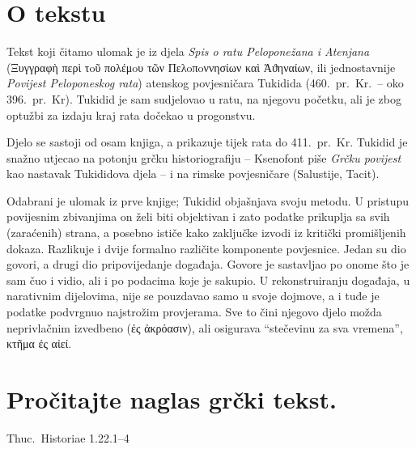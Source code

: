 
\section*{O tekstu}

Tekst koji čitamo ulomak je iz djela \textit{Spis o ratu Peloponežana i Atenjana} \textgreek[variant=ancient]{(Ξυγγραφὴ περὶ τoῦ πολέμoυ τῶν Пελoπoννησίων καὶ Ἀϑηναίων,} ili jednostavnije \textit{Povijest Peloponeskog rata}) atenskog povjesničara Tukidida (460.\ pr.~Kr.\ – oko 396.\ pr.~Kr). Tukidid je sam sudjelovao u ratu, na njegovu početku, ali je zbog optužbi za izdaju kraj rata dočekao u progonstvu. 

Djelo se sastoji od osam knjiga, a prikazuje tijek rata do 411.\ pr.~Kr. Tukidid je snažno utjecao na potonju grčku historiografiju – Ksenofont piše \textit{Grčku povijest} kao nastavak Tukididova djela – i na rimske povjesničare (Salustije, Tacit).

Odabrani je ulomak iz prve knjige; Tukidid objašnjava svoju metodu. U pristupu povijesnim zbivanjima on želi biti objektivan i zato podatke prikuplja sa svih (zaraćenih) strana, a posebno ističe kako zaključke izvodi iz kritički promišljenih dokaza. Razlikuje i dvije formalno različite komponente povjesnice. Jedan su dio govori, a drugi dio pripovijedanje događaja. Govore je sastavljao po onome što je sam čuo i vidio, ali i po podacima koje je sakupio. U rekonstruiranju događaja, u narativnim dijelovima, nije se pouzdavao samo u svoje dojmove, a i tuđe je podatke podvrgnuo najstrožim provjerama. Sve to čini njegovo djelo možda neprivlačnim izvedbeno \textgreek[variant=ancient]{(ἐς ἀκρόασιν)}, ali osigurava ``stečevinu za sva vremena'', \textgreek[variant=ancient]{κτῆμα ἐς αἰεί.}

\newpage

\section*{Pročitajte naglas grčki tekst.}

Thuc.\ Historiae 1.22.1–4


\medskip



